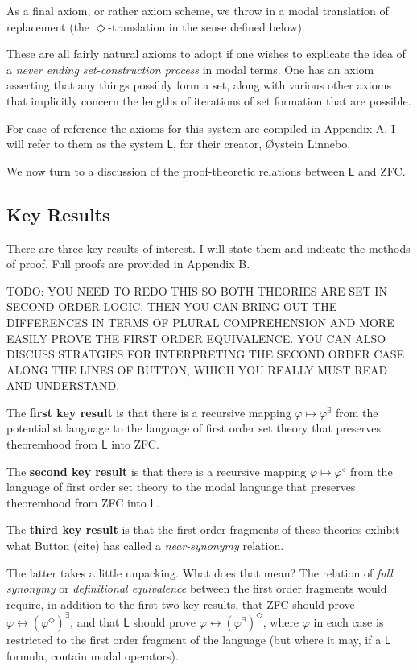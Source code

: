 \documentclass{article}
\begin{document}
As a final axiom, or rather axiom scheme, we throw in a modal 
translation of replacement (the $\Diamond$-translation in the sense defined below).

These are all fairly natural axioms to adopt if one wishes to explicate the idea 
of a \emph{never ending set-construction process} in modal terms. One has an axiom 
asserting that any things possibly form a set, along with various other axioms 
that implicitly concern the lengths of iterations of set formation that are possible.

For ease of reference the axioms 
for this system are compiled in Appendix A. I will refer to them as the system $\mathsf{L}$,
for their creator, \O ystein Linnebo.

We now turn to a discussion of the proof-theoretic relations between $\mathsf{L}$
and ZFC. 
\subsection{Key Results}
There are three key results of interest. I will state them and indicate the methods of proof. 
Full proofs are provided in Appendix B. 

TODO: YOU NEED TO REDO THIS SO BOTH THEORIES ARE SET IN 
SECOND ORDER LOGIC. THEN YOU CAN BRING OUT THE DIFFERENCES IN 
TERMS OF PLURAL COMPREHENSION AND MORE EASILY PROVE THE FIRST ORDER 
EQUIVALENCE. YOU CAN ALSO DISCUSS STRATGIES FOR INTERPRETING 
THE SECOND ORDER CASE ALONG THE LINES OF BUTTON, WHICH YOU REALLY 
MUST READ AND UNDERSTAND.

The {\bf first key result} is that there is a recursive mapping 
$\varphi \mapsto \varphi^\exists$ from the potentialist 
language to the language of first order set theory that preserves theoremhood 
from $\mathsf{L}$ into ZFC.

The {\bf second key result} is that there is a recursive mapping 
$\varphi \mapsto \varphi^\diamond$ from the language of first 
order set theory to the modal language that preserves theoremhood 
from ZFC into $\mathsf{L}$.

The {\bf third key result} is that the first order fragments of these theories 
exhibit what Button (cite) has called a \emph{near-synonymy} relation.

The latter takes a little unpacking. What does that mean? 
The relation of \emph{full synonymy} or \emph{definitional equivalence} between 
the first order fragments would require, in addition to the first two key results, 
that ZFC should prove $\varphi \leftrightarrow (\varphi^\Diamond)^\exists$, 
and that $\mathsf{L}$ should prove
$\varphi \leftrightarrow (\varphi^\exists)^\Diamond$, where $\varphi$ in each case 
is restricted to the first order fragment of the language (but where it may, if a 
$\mathsf{L}$ formula, contain modal operators).
\end{document}
